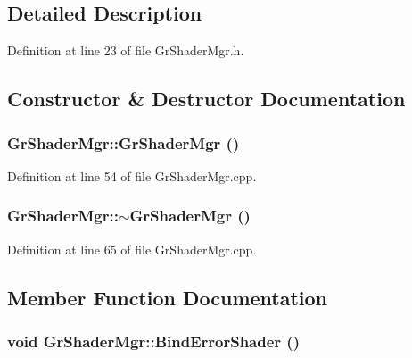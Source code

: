 \subsection{Detailed Description}


Definition at line 23 of file GrShaderMgr.h.

\subsection{Constructor \& Destructor Documentation}
\hypertarget{class_gr_shader_mgr_fe39fc50ee4650c4966fe29225708954}{
\subsubsection[{GrShaderMgr}]{\setlength{\rightskip}{0pt plus 5cm}GrShaderMgr::GrShaderMgr ()}}
\label{class_gr_shader_mgr_fe39fc50ee4650c4966fe29225708954}




Definition at line 54 of file GrShaderMgr.cpp.\hypertarget{class_gr_shader_mgr_7bd37ffc68abeae00188cb7acfcc5f45}{
\subsubsection[{$\sim$GrShaderMgr}]{\setlength{\rightskip}{0pt plus 5cm}GrShaderMgr::$\sim$GrShaderMgr ()}}
\label{class_gr_shader_mgr_7bd37ffc68abeae00188cb7acfcc5f45}




Definition at line 65 of file GrShaderMgr.cpp.

\subsection{Member Function Documentation}
\hypertarget{class_gr_shader_mgr_2478fc2631d56f5e376ecd3a58b0b855}{
\subsubsection[{BindErrorShader}]{\setlength{\rightskip}{0pt plus 5cm}void GrShaderMgr::BindErrorShader ()}}
\label{class_gr_shader_mgr_2478fc2631d56f5e376ecd3a58b0b855}





